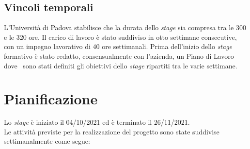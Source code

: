 \subsection{Vincoli temporali}
L’Università di Padova stabilisce che la durata dello \emph{stage} sia compresa tra le 300 e le 320 ore.
Il carico di lavoro è stato suddiviso in otto settimane consecutive, con un impegno lavorativo di 40 ore settimanali.
Prima dell’inizio dello \emph{stage} formativo è stato redatto, consensualmente con l'azienda, un Piano di Lavoro dove \
sono stati definiti gli obiettivi dello \emph{stage} ripartiti tra le varie settimane.

\section{Pianificazione}
Lo \emph{stage} è iniziato il 04/10/2021 ed è terminato il 26/11/2021. \\
Le attività previste per la realizzazione del progetto sono state suddivise settimanalmente come segue:
